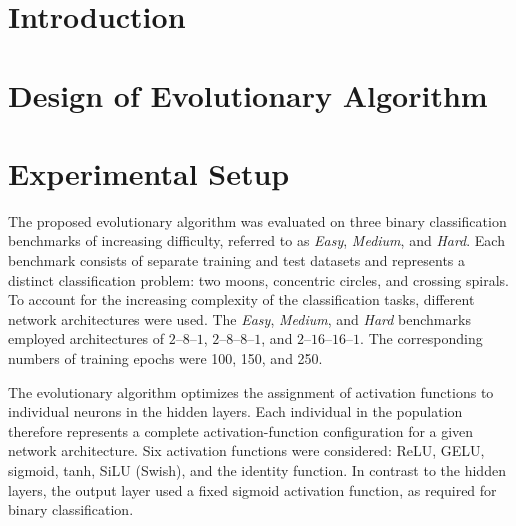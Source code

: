 \documentclass[12pt,fleqn,a4paper]{article}
\begin{document}
\clearpage
\pagestyle{headings}
\setcounter{page}{1}
\setcounter{page}{1}


\section{Introduction}


\newpage
\section{Design of Evolutionary Algorithm}

\newpage
\section{Experimental Setup}

The proposed evolutionary algorithm was evaluated on three binary classification benchmarks of increasing difficulty, referred to as \textit{Easy}, \textit{Medium}, and \textit{Hard}. Each benchmark consists of separate training and test datasets and represents a distinct classification problem: two moons, concentric circles, and crossing spirals. To account for the increasing complexity of the classification tasks, different network architectures were used. The \textit{Easy}, \textit{Medium}, and \textit{Hard} benchmarks employed architectures of $2$--$8$--$1$, $2$--$8$--$8$--$1$, and $2$--$16$--$16$--$1$. The corresponding numbers of training epochs were 100, 150, and 250.

The evolutionary algorithm optimizes the assignment of activation functions to individual neurons in the hidden layers. Each individual in the population therefore represents a complete activation-function configuration for a given network architecture. Six activation functions were considered: ReLU, GELU, sigmoid, tanh, SiLU (Swish), and the identity function. In contrast to the hidden layers, the output layer used a fixed sigmoid activation function, as required for binary classification.
\end{document}
